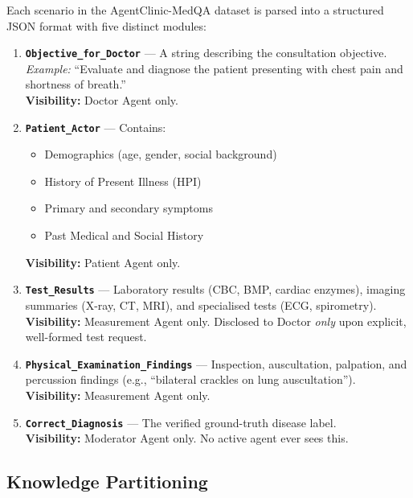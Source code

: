 Each scenario in the AgentClinic-MedQA dataset is parsed into a structured JSON format with five distinct modules:

\begin{enumerate}[label=\textbf{\arabic*.}]
    \item \textbf{\texttt{Objective\_for\_Doctor}} --- A string describing the consultation objective.\\
    \textit{Example:} ``Evaluate and diagnose the patient presenting with chest pain and shortness of breath.''\\
    \textbf{Visibility:} Doctor Agent only.

    \item \textbf{\texttt{Patient\_Actor}} --- Contains:
    \begin{itemize}
        \item Demographics (age, gender, social background)
        \item History of Present Illness (HPI)
        \item Primary and secondary symptoms
        \item Past Medical and Social History
    \end{itemize}
    \textbf{Visibility:} Patient Agent only.

    \item \textbf{\texttt{Test\_Results}} --- Laboratory results (CBC, BMP, cardiac enzymes), imaging summaries (X-ray, CT, MRI), and specialised tests (ECG, spirometry).\\
    \textbf{Visibility:} Measurement Agent only. Disclosed to Doctor \textit{only} upon explicit, well-formed test request.

    \item \textbf{\texttt{Physical\_Examination\_Findings}} --- Inspection, auscultation, palpation, and percussion findings (e.g., ``bilateral crackles on lung auscultation'').\\
    \textbf{Visibility:} Measurement Agent only.

    \item \textbf{\texttt{Correct\_Diagnosis}} --- The verified ground-truth disease label.\\
    \textbf{Visibility:} Moderator Agent only. No active agent ever sees this.
\end{enumerate}

\subsection{Knowledge Partitioning}

